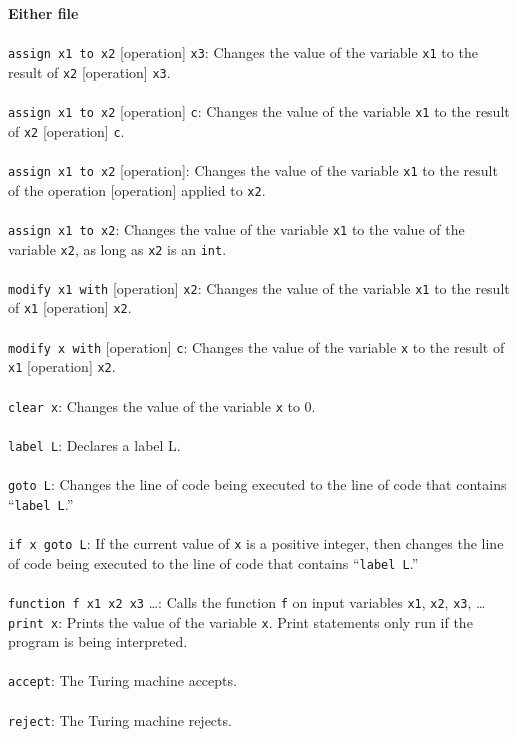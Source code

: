 \documentclass[11pt]{report}
\begin{document}
\textbf{Either file} \\ \\
\texttt{assign x1 to x2} [operation] \texttt{x3}: Changes the value of the variable \texttt{x1} to the result of \texttt{x2} [operation] \texttt{x3}. \\ \\
\texttt{assign x1 to x2} [operation] \texttt{c}: Changes the value of the variable \texttt{x1} to the result of \texttt{x2} [operation] \texttt{c}. \\ \\
\texttt{assign x1 to x2} [operation]: Changes the value of the variable \texttt{x1} to the result of the operation [operation] applied to \texttt{x2}. \\ \\
\texttt{assign x1 to x2}: Changes the value of the variable \texttt{x1} to the value of the variable \texttt{x2}, as long as \texttt{x2} is an \texttt{int}. \\ \\
\texttt{modify x1 with} [operation] \texttt{x2}: Changes the value of the variable \texttt{x1} to the result of \texttt{x1} [operation] \texttt{x2}. \\ \\
\texttt{modify x with} [operation] \texttt{c}: Changes the value of the variable \texttt{x} to the result of \texttt{x1} [operation] \texttt{x2}. \\ \\
\texttt{clear x}: Changes the value of the variable \texttt{x} to 0. \\ \\
\texttt{label L}: Declares a label L. \\ \\
\texttt{goto L}: Changes the line of code being executed to the line of code that contains ``\texttt{label L}.'' \\ \\
\texttt{if x goto L}: If the current value of \texttt{x} is a positive integer, then changes the line of code being executed to the line of code that contains ``\texttt{label L}.'' \\ \\
\texttt{function f x1 x2 x3} \dots: Calls the function \texttt{f} on input variables \texttt{x1}, \texttt{x2}, \texttt{x3}, \dots \\
\texttt{print x}: Prints the value of the variable \texttt{x}. Print statements only run if the program is being interpreted. \\ \\
\texttt{accept}: The Turing machine accepts. \\ \\ 
\texttt{reject}: The Turing machine rejects. 
\end{document}
